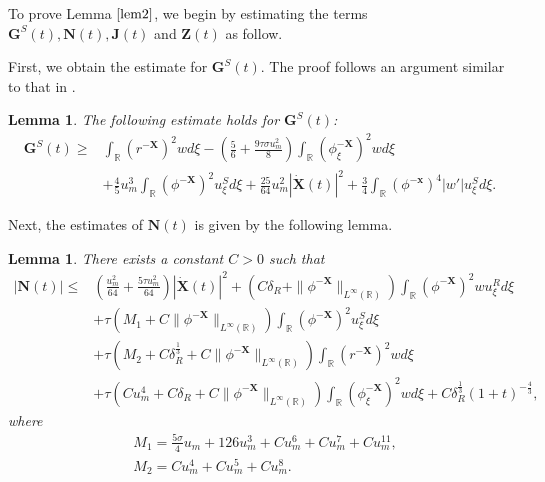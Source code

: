 \documentclass[10pt,reqno]{amsart}
\numberwithin{equation}{section}
\newtheorem{lemma}[theorem]{Lemma}
\begin{document}
	To prove Lemma $\ref{lem2}$, we begin by estimating the terms $\mathbf{G}^S(t),\mathbf{N}(t),\mathbf{J}(t)$ and $\mathbf{Z}(t)$ as follow.\par
	First, we obtain the estimate for $\mathbf{G}^S(t)$. The proof follows an argument similar to that in \cite{ref16}.
	\begin{lemma}\label{lemgs}
		The following estimate holds for $\mathbf{G}^{S}(t)$:
		\begin{equation} 
			\begin{aligned}
				\mathbf{G}^{S}(t) \geq &\int_{\mathbb{R}}(r^{-\mathbf{X}})^2wd\xi-\left(\frac{5}{6}+\frac{9\tau\sigma u_m^2}{8}\right)\int_{\mathbb{R}} (\phi_{\xi}^{-\mathbf{X}})^{2}w d\xi \\
				&+ \frac{4}{5} u_{m}^{3} \int_{\mathbb{R}} (\phi^{-\mathbf{X}})^{2} u_{\xi}^{S} d\xi+ \frac{25}{64} u_{m}^{2} |\dot{\mathbf{X}}(t)|^{2} + \frac{3}{4} \int_{\mathbb{R}} (\phi^{-\mathbf{x}})^{4} |w'| u_{\xi}^{S} d\xi. 
			\end{aligned}
		\end{equation}
	\end{lemma}
	Next, the estimates of $\mathbf{N}(t)$ is given by the following lemma.
	\begin{lemma}\label{lem6}
		There exists a constant $C>0$ such that
		\begin{align*}
			\left|\mathbf{N}(t)\right|\leq&\left(\frac{u_m^2}{64}+\frac{5\tau u_m^2}{64}\right)|\dot{\mathbf{X}}(t)|^2+\left(C\delta_R+\|\phi^{-\mathbf{X}}\|_{L^{\infty}(\mathbb{R})}\right)\int_{\mathbb{R}}(\phi^{-\mathbf{X}})^2wu_{\xi}^Rd\xi\\
			&+\tau\left(M_1+C\|\phi^{-\mathbf{X}}\|_{L^{\infty}(\mathbb{R})}\right)\int_{\mathbb{R}}(\phi^{-\mathbf{X}})^2u_{\xi}^Sd\xi\\
			&+\tau\left(M_2+C\delta_R^{\frac{1}{3}}+C\|\phi^{-\mathbf{X}}\|_{L^{\infty}(\mathbb{R})}\right)\int_{\mathbb{R}}(r^{-\mathbf{X}})^2wd\xi\\
			&+\tau\left(Cu_m^4+C\delta_R+C\|\phi^{-\mathbf{X}}\|_{L^{\infty}(\mathbb{R})}\right)\int_{\mathbb{R}}(\phi_{\xi}^{-\mathbf{X}})^2wd\xi+C\delta_R^{\frac{1}{3}}(1+t)^{-\frac{4}{3}},
		\end{align*}
		where 
		\begin{align*}
			&M_1=\frac{5\sigma}{4}u_m+126u_m^3+C u_m^6+C u_m^7+Cu_m^{11},\\
			&M_2=Cu_m^4+C u_m^5+Cu_m^8.
		\end{align*}
	\end{lemma}
\end{document}
